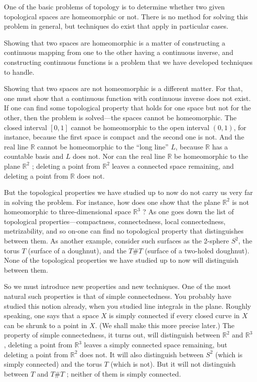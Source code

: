 
One of the basic problems of topology is to determine whether two given topological spaces are homeomorphic or not. There is no method for solving this problem in general, but techniques do exist that apply in particular cases.

Showing that two spaces are homeomorphic is a matter of constructing a continuous mapping from one to the other having a continuous inverse, and constructing continuous functions is a problem that we have developed techniques to handle.

Showing that two spaces are not homeomorphic is a different matter. For that, one must show that a continuous function with continuous inverse does not exist. If one can find some topological property that holds for one space but not for the other, then the problem is solved---the spaces cannot be homeomorphic. The closed interval \([ {0,1}]\) cannot be homeomorphic to the open interval \((0,1)\), for instance, because the first space is compact and the second one is not. And the real line \(\mathbb{R}\) cannot be homeomorphic to the ``long line'' \(L\), because \(\mathbb{R}\) has a countable basis and \(L\) does not. Nor can the real line \(\mathbb{R}\) be homeomorphic to the plane \(\mathbb{R}^{2}\) ; deleting a point from \(\mathbb{R}^{2}\) leaves a connected space remaining, and deleting a point from \(\mathbb{R}\) does not.

But the topological properties we have studied up to now do not carry us very far in solving the problem. For instance, how does one show that the plane \(\mathbb{R}^{2}\) is not homeomorphic to three-dimensional space \(\mathbb{R}^{3}\) ? As one goes down the list of topological properties—compactness, connectedness, local connectedness, metrizability, and so on-one can find no topological property that distinguishes between them. As another example, consider such surfaces as the 2-sphere \(S^{2}\), the torus \(T\) (surface of a doughnut), and the  \(T\# T\) (surface of a two-holed doughnut). None of the topological properties we have studied up to now will distinguish between them.

So we must introduce new properties and new techniques. One of the most natural such properties is that of simple connectedness. You probably have studied this notion already, when you studied line integrals in the plane. Roughly speaking, one says that a space \(X\) is simply connected if every closed curve in \(X\) can be shrunk to a point in \(X\). (We shall make this more precise later.) The property of simple connectedness, it turns out, will distinguish between \(\mathbb{R}^{2}\) and \(\mathbb{R}^{3}\), deleting a point from \(\mathbb{R}^{3}\) leaves a simply connected space remaining, but deleting a point from \(\mathbb{R}^{2}\) does not. It will also distinguish between \(S^{2}\) (which is simply connected) and the torus \(T\) (which is not). But it will not distinguish between \(T\) and \(T\# T\) ; neither of them is simply connected.

